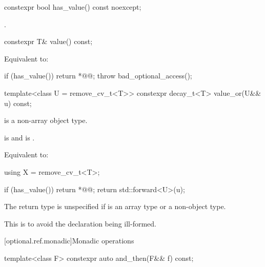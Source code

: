 %
\begin{itemdecl}
constexpr bool has_value() const noexcept;
\end{itemdecl}

\begin{itemdescr}
\pnum
\returns
{}.
\end{itemdescr}

%
\begin{itemdecl}
constexpr T& value() const;
\end{itemdecl}

\begin{itemdescr}
\pnum
\effects
Equivalent to:
\begin{codeblock}
if (has_value()) {
  return *@@;
}
throw bad_optional_access();
\end{codeblock}
\end{itemdescr}

%
\begin{itemdecl}
template<class U = remove_cv_t<T>>
  constexpr decay_t<T> value_or(U&& u) const;
\end{itemdecl}

\begin{itemdescr}
\pnum
\constraints
{} is a non-array object type.

\pnum
\mandates
{} is  and  is .

\pnum
\effects
Equivalent to:
\begin{codeblock}
using X = remove_cv_t<T>;

if (has_value()) {
  return *@@;
}
return std::forward<U>(u);
\end{codeblock}

\pnum
\remarks
The return type is unspecified if  is an array type or a non-object type.
\begin{note}
This is to avoid the declaration being ill-formed.
\end{note}
\end{itemdescr}

[optional.ref.monadic]{Monadic operations}

%
\begin{itemdecl}
template<class F>
  constexpr auto and_then(F&& f) const;
\end{itemdecl}


